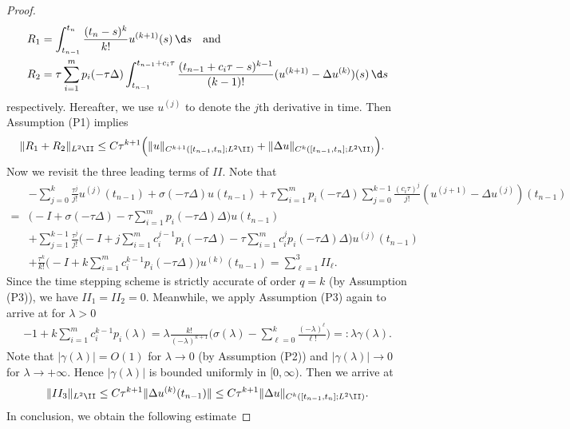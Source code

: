 \begin{proof}
\begin{align*}
 R_1 &= \int_{t_{n-1}}^{t_n} \frac{(t_n-s)^k}{k!} u^{(k+1)}(s) \,\d s\quad \text{and}\quad \\
  R_2 &=   \tau \sum_{i=1}^m p_i(-\tau \Delta) \int_{t_{n-1}}^{t_{n-1}+c_i\tau} \frac{(t_{n-1}+c_i\tau-s)^{k-1}}{(k-1)!} (u^{(k+1)}-\Delta u^{(k)})(s) \,\d s
\end{align*}
respectively. Hereafter, we use $u^{(j)}$ to denote the $j$th derivative in time. Then Assumption (P1) implies
\begin{align*}
 \|R_1+R_2\|_{L^2\II} &\le C \tau^{k+1} \Big(\|  u \|_{C^{k+1} ([t_{n-1},t_n];L^2\II)} + \|  \Delta u \|_{C^{k} ([t_{n-1},t_n];L^2\II)} \Big).
\end{align*}
Now we revisit the three leading terms of $II$. Note that
\begin{align*}
& -\sum_{j=0}^k\frac{\tau^j}{j!} u^{(j)} (t_{n-1}) + \sigma(-\tau \Delta)u(t_{n-1})
  + \tau \sum_{i=1}^m p_i(-\tau \Delta) \sum_{j=0}^{k-1} \frac{(c_i\tau)^j}{j!}
  (u^{(j+1)} - \Delta u^{(j)})(t_{n-1})\\
 =& \Big(-I +  \sigma(-\tau \Delta) - \tau \sum_{i=1}^m p_i(-\tau \Delta) \Delta \Big)u(t_{n-1}) \\
 & +   \sum_{j=1}^{k-1} \frac{\tau^j}{j!} \Big(- I  +  j \sum_{i=1}^m c_i^{j-1} p_i(-\tau \Delta) - \tau\sum_{i=1}^m c_i^{j} p_i(-\tau \Delta) \Delta\Big)u^{(j)}(t_{n-1})   \\
 & +  \frac{\tau^k}{k!} \Big(-I +  k\sum_{i=1}^m c_i^{k-1}p_i(-\tau\Delta)\Big )u^{(k)}(t_{n-1}) =\sum_{\ell=1}^3 II_\ell.
\end{align*}
Since the time stepping scheme is strictly accurate of order $q=k$ (by Assumption (P3)),
we have $ II_1=  II_2=0$. Meanwhile,
we apply Assumption (P3) again to arrive at for $\lambda>0$
\begin{align*}
  -1 + k \sum_{i=1}^m c_i^{k-1} p_i(\lambda) = \lambda \frac{k!}{(-\lambda)^{k+1}} \Big(\sigma(\lambda)-\sum_{\ell=0}^k\frac{(-\lambda)^\ell}{\ell!}\Big) =: \lambda \gamma(\lambda).
\end{align*}
Note that $|\gamma(\lambda)|=O(1)$ for $\lambda\rightarrow0$ (by Assumption (P2))
and $|\gamma(\lambda)|\rightarrow 0$ for  $\lambda\rightarrow +\infty$. Hence $|\gamma(\lambda)|$ is bounded
uniformly in $[0,\infty)$. Then we arrive at
\begin{align*}
\|  II_3 \|_{L^2\II} \le C \tau^{k+1} \|  \Delta u^{(k)}(t_{n-1}) \| \le  C \tau^{k+1} \|  \Delta u \|_{C^{k}([t_{n-1},t_n];L^2\II)}.
\end{align*}
In conclusion, we obtain the following estimate

\end{proof}
